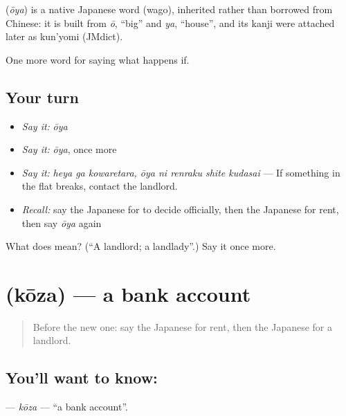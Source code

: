 \begin{cousinweb}
\textbf{} (\emph{ōya}) is a native Japanese word (wago), inherited rather than borrowed from Chinese: it is built from \emph{ō}, \textquotedblleft{}big\textquotedblright{} and \emph{ya}, \textquotedblleft{}house\textquotedblright{}, and its kanji were attached later as kun'yomi (JMdict).
\end{cousinweb}

\begin{grammarlens}[title={What you've built}]
One more word for saying what happens if.
\end{grammarlens}

\subsection*{Your turn}
\begin{itemize}
\raggedright
  \item \emph{Say it:} \emph{ōya}
  \item \emph{Say it:} \emph{ōya}, once more
  \item \emph{Say it:} \emph{heya ga kowaretara, ōya ni renraku shite kudasai} — If something in the flat breaks, contact the landlord.
  \item \emph{Recall:} say the Japanese for to decide officially, then the Japanese for rent, then say \emph{ōya} again
\end{itemize}

\begin{tcolorbox}[breakable,colback=teal!4,colframe=teal!35!black,title={Before you move on}]
What does  mean? (\textquotedblleft{}A landlord; a landlady\textquotedblright{}.) Say it once more.
\end{tcolorbox}
\section[\texorpdfstring{\ja{こうざ} (kōza)}{こうざ (kōza)}]{ (kōza) — a bank account}

\label{lesson:JA-C358-kouza}



\begin{quote}
Before the new one: say the Japanese for rent, then the Japanese for a landlord.
\end{quote}

\subsection*{You'll want to know: }
\textbf{} — \emph{kōza} — \textquotedblleft{}a bank account\textquotedblright{}.

